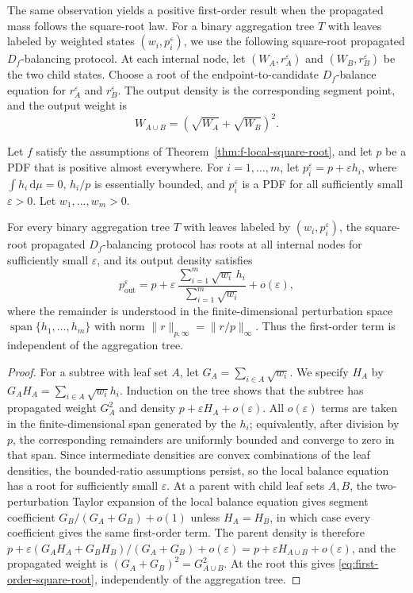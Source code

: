 \documentclass[runningheads]{llncs}
\newcommand{\dd}{\,\mathrm{d}}
\begin{document}
The same observation yields a positive first-order result when the propagated
mass follows the square-root law. For a binary aggregation tree $T$ with leaves
labeled by weighted states $(w_i,p_i^\varepsilon)$, we use the following
square-root propagated $D_f$-balancing protocol. At each internal node, let
$(W_A,r_A^\varepsilon)$ and $(W_B,r_B^\varepsilon)$ be the two child states.
Choose a root of the endpoint-to-candidate $D_f$-balance equation for
$r_A^\varepsilon$ and $r_B^\varepsilon$. The output density is the
corresponding segment point, and the output weight is
\[ W_{A\cup B}=(\sqrt{W_A}+\sqrt{W_B})^2 .
\]

\begin{corollary}
\label{cor:sqrt-first-order}
Let $f$ satisfy the assumptions of Theorem~\ref{thm:f-local-square-root}, and
let $p$ be a PDF that is positive almost everywhere. For $i=1,\ldots,m$, let
$p_i^\varepsilon=p+\varepsilon h_i$, where $\int h_i\dd\mu=0$, $h_i/p$
is essentially bounded, and $p_i^\varepsilon$ is a PDF for all sufficiently
small $\varepsilon>0$. Let $w_1,\ldots,w_m>0$.

For every binary aggregation tree $T$ with leaves labeled by
$(w_i,p_i^\varepsilon)$, the square-root propagated $D_f$-balancing protocol
has roots at all internal nodes for sufficiently small $\varepsilon$, and its
output density satisfies
\begin{equation}
  p^\varepsilon_{\mathrm{out}}
  =
  p+\varepsilon\,
  \frac{\sum_{i=1}^m \sqrt{w_i}\,h_i}{\sum_{i=1}^m\sqrt{w_i}}
  +o(\varepsilon),
  \label{eq:first-order-square-root}
\end{equation}
where the remainder is understood in the finite-dimensional perturbation space
$\operatorname{span}\{h_1,\ldots,h_m\}$ with norm
$\|r\|_{p,\infty}=\|r/p\|_\infty$. Thus the first-order term is
independent of the aggregation tree.
\end{corollary}

\begin{proof}
For a subtree with leaf set $A$, let
$G_A=\sum_{i\in A}\sqrt{w_i}$. We specify $H_A$ by
$G_AH_A=\sum_{i\in A}\sqrt{w_i}h_i$. Induction on the tree shows that
the subtree has propagated weight $G_A^2$ and density
$p+\varepsilon H_A+o(\varepsilon)$. All $o(\varepsilon)$ terms are taken in
the finite-dimensional span generated by the $h_i$; equivalently, after
division by $p$, the corresponding remainders are uniformly bounded and
converge to zero in that span. Since intermediate densities are convex
combinations of the leaf densities, the bounded-ratio assumptions persist, so
the local balance equation has a root for sufficiently small $\varepsilon$. At
a parent with child leaf sets $A,B$, the two-perturbation Taylor expansion of
the local balance equation gives segment coefficient
$G_B/(G_A+G_B)+o(1)$ unless $H_A=H_B$, in which case every coefficient gives
the same first-order term. The parent density is therefore
$p+\varepsilon(G_AH_A+G_BH_B)/(G_A+G_B)+o(\varepsilon)
=p+\varepsilon H_{A\cup B}+o(\varepsilon)$, and the propagated weight is
$(G_A+G_B)^2=G_{A\cup B}^2$. At the root this gives
\eqref{eq:first-order-square-root}, independently of the aggregation tree.
\end{proof}
\end{document}
